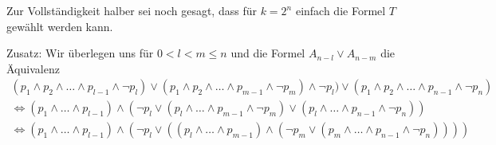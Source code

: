 \begin{solution}
Zur Vollständigkeit halber sei noch gesagt, dass für $k = 2^n$ einfach die Formel $T$ gewählt werden kann.

Zusatz: Wir überlegen uns für $0 < l < m \leq n$ und die Formel $A_{n-l} \lor A_{n-m}$ die Äquivalenz
\begin{align*}
(p_1 \land p_2 \land \dots \land p_{l-1} \land \neg p_l) \lor (p_1 \land p_2 \land \dots \land p_{m-1} \land \neg p_m) \land \neg p_l) \lor (p_1 \land p_2 \land \dots \land p_{n-1} \land \neg p_n) \\
\Leftrightarrow (p_1 \land \dots \land p_{l-1}) \land (\neg p_l \lor (p_l \land \dots \land p_{m-1} \land \neg p_m) \lor (p_l \land \dots \land p_{n-1} \land \neg p_n)) \\
\Leftrightarrow (p_1 \land \dots \land p_{l-1}) \land (\neg p_l \lor ((p_l \land \dots \land p_{m-1}) \land (\neg p_m \lor (p_m \land \dots \land p_{n-1} \land \neg p_n)))) 
\end{align*}

\end{solution}


